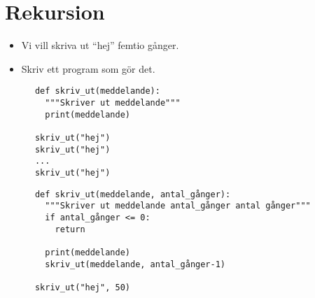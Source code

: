 \mode*

\section{Rekursion}

\begin{frame}
  \begin{exercise}
    \begin{itemize}
      \item Vi vill skriva ut \enquote{hej} femtio gånger.
      \item Skriv ett program som gör det.
    \end{itemize}
  \end{exercise}
\end{frame}

\begin{frame}[fragile]
  \begin{solution}
    \begin{verbatim}
      def skriv_ut(meddelande):
        """Skriver ut meddelande"""
        print(meddelande)

      skriv_ut("hej")
      skriv_ut("hej")
      ...
      skriv_ut("hej")
    \end{verbatim}
  \end{solution}
\end{frame}

\begin{frame}[fragile]
  \begin{solution}
    \begin{verbatim}
      def skriv_ut(meddelande, antal_gånger):
        """Skriver ut meddelande antal_gånger antal gånger"""
        if antal_gånger <= 0:
          return

        print(meddelande)
        skriv_ut(meddelande, antal_gånger-1)

      skriv_ut("hej", 50)
    \end{verbatim}
  \end{solution}
\end{frame}

